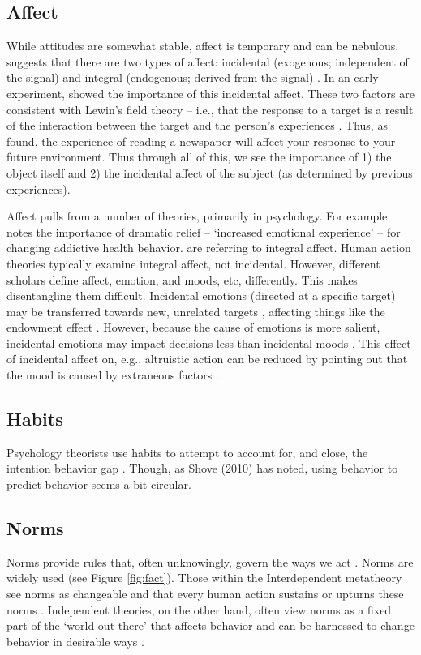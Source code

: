 \documentclass[12 pt]{article}
\begin{document}
		\subsection{Affect}
		 While attitudes are somewhat stable, affect is temporary and can be nebulous. \textcite{Vastfjall2016} suggests that there are two types of affect: incidental (exogenous; independent of the signal) and integral (endogenous; derived from the signal) \parencite{Loewenstein2002}. In an early experiment, \textcite{Johnson1983} showed the importance of this incidental affect. These two factors are consistent with Lewin's field theory -- i.e., that the response to a target is a result of the interaction between the target and the person's experiences \parencite{Lewin1939}. Thus, as \textcite{Johnson1983} found, the experience of reading a newspaper will affect your response to your future environment. Thus through all of this, we see the importance of 1) the object itself and 2) the incidental affect of the subject (as determined by previous experiences). 
		
		Affect pulls from a number of theories, primarily in psychology. For example \parencite{Prochaska1997} notes the importance of dramatic relief -- `increased emotional experience' -- for changing addictive health behavior. \textcite{Prochaska1997} are referring to integral affect. Human action theories typically examine integral affect, not incidental.  However, different scholars define affect, emotion, and moods, etc, differently. This makes disentangling them difficult. Incidental emotions (directed at a specific target) may be transferred towards new, unrelated targets \parencite{Loewenstein2002}, affecting things like the endowment effect \parencite{Lerner2004}. However, because the cause of emotions is more salient, incidental emotions may impact decisions less than incidental moods \parencite{Vastfjall2016}.  This effect of incidental affect on, e.g., altruistic action can be reduced by pointing out that the mood is caused by extraneous factors \parencite{Schwarz1983,Schwarz2012}. 
		\subsection{Habits}
		Psychology theorists use habits to attempt to account for, and close, the intention behavior gap \parencite{DeBruijn2007,Gardner2011}. Though, as Shove (2010) has noted, using behavior to predict behavior seems a bit circular. 
		\subsection{Norms}
		Norms provide rules that, often unknowingly, govern the ways we act \parencite{Raymond2014}. Norms are widely used (see Figure \ref{fig:fact}).  Those within the Interdependent metatheory see norms as changeable and that every human action sustains or upturns these norms \parencite[e.g.,][]{Raymond2014}. Independent theories, on the other hand, often view norms as a fixed part of the `world out there' that affects behavior and can be harnessed to change behavior in desirable ways \parencite[e.g.,][]{Ajzen1985,Schultz2007}. 
\end{document}
